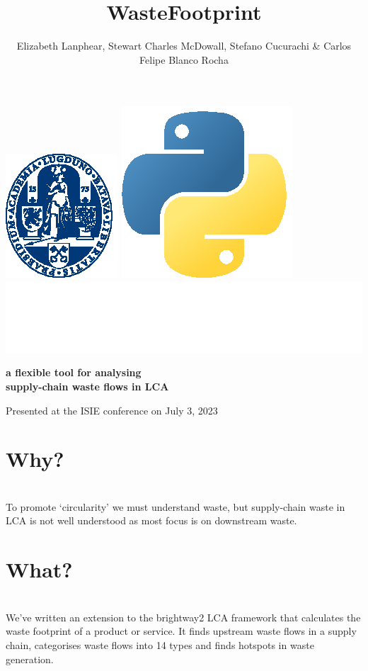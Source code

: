 \documentclass[a0paper,fleqn]{betterposter}
\begin{document}
{{\begin{minipage}{0.5\textwidth}
\begin{flushleft}
        \end{flushleft}
        \vspace{100pt}
        \end{minipage}
        \includegraphics[height=0.08\textwidth]{img/logoUL_white}\hfill
        \includegraphics[height=0.07\textwidth]{img/python}\hfill
        \includegraphics[height=0.07\textwidth]{img/brightway}

    }{
    }
    }{

    \title{WasteFootprint}
    {\selectfont\textbf{a flexible tool for analysing\\ supply-chain waste flows in LCA}}\\

    \author{Elizabeth Lanphear, Stewart Charles McDowall, Stefano Cucurachi \& Carlos Felipe Blanco Rocha}
    {\fontsize{35}{10}\selectfont Presented at the ISIE conference on July 3, 2023}
    
    \section{\hspace{2cm}Why?}\\
    To promote `circularity' we must understand waste, but supply-chain waste in LCA is not well understood as most focus is on downstream waste.

    \section{\hspace{2cm}What?}\\
    We've written an extension to the brightway2 LCA framework that calculates the waste footprint of a product or service.
    It finds upstream waste flows in a supply chain, categorises waste flows into 14 types and finds hotspots in waste generation.

}
\end{document}
